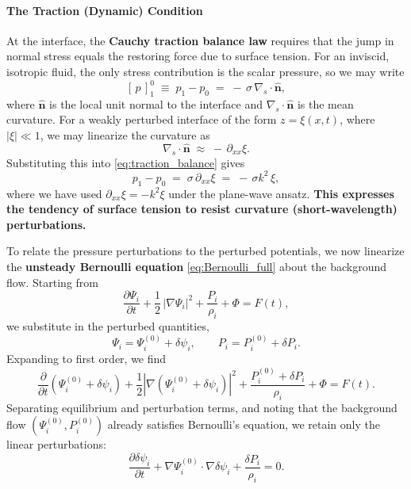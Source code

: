 \paragraph{The Traction (Dynamic) Condition}
At the interface, the \textbf{Cauchy traction balance law} requires that the jump in normal stress equals the restoring force due to surface tension. 
For an inviscid, isotropic fluid, the only stress contribution is the scalar pressure, so we may write
\begin{equation}
\label{eq:traction_balance}
\left[\,p\,\right]_{1}^{0} \;\equiv\; p_1 - p_0 \;=\; -\,\sigma\,\nabla_{\!s}\!\cdot\!\hat{\mathbf{n}},
\end{equation}
where $\hat{\mathbf{n}}$ is the local unit normal to the interface and $\nabla_{\!s}\!\cdot\!\hat{\mathbf{n}}$ is the mean curvature. 
For a weakly perturbed interface of the form $z=\xi(x,t)$, where $\lvert\xi\rvert \ll 1$, we may linearize the curvature as
\[
\nabla_{\!s}\!\cdot\!\hat{\mathbf{n}} \;\approx\; -\,\partial_{xx}\xi.
\]
Substituting this into \eqref{eq:traction_balance} gives
\begin{equation}
\label{eq:dynamic_sigma_clean}
p_1 - p_0 \;=\; \sigma\,\partial_{xx}\xi \;=\; -\,\sigma k^2\,\xi,
\end{equation}
where we have used $\partial_{xx}\xi = -k^2\xi$ under the plane-wave ansatz. \textbf{This expresses the tendency of surface tension to resist curvature (short-wavelength) perturbations.}
\par
To relate the pressure perturbations to the perturbed potentials, we now linearize the \textbf{unsteady Bernoulli equation} \eqref{eq:Bernoulli_full} about the background flow. 
Starting from
\begin{equation}
\frac{\partial \Psi_i}{\partial t} + \frac{1}{2}\,\lvert\nabla\Psi_i\rvert^2 + \frac{P_i}{\rho_i} + \Phi = F(t),
\end{equation}
we substitute in the perturbed quantities,
\[
\Psi_i = \Psi_i^{(0)} + \delta\psi_i, 
\qquad
P_i = P_i^{(0)} + \delta P_i.
\]
Expanding to first order, we find
\[
\frac{\partial}{\partial t}\left(\Psi_i^{(0)} + \delta\psi_i\right)
+ \frac{1}{2}\left|\nabla(\Psi_i^{(0)} + \delta\psi_i)\right|^2
+ \frac{P_i^{(0)} + \delta P_i}{\rho_i} + \Phi
= F(t).
\]
Separating equilibrium and perturbation terms, and noting that the background flow $(\Psi_i^{(0)},P_i^{(0)})$ already satisfies Bernoulli’s equation, we retain only the linear perturbations:
\[
\frac{\partial \delta\psi_i}{\partial t}
+ \nabla \Psi_i^{(0)} \!\cdot\! \nabla \delta\psi_i
+ \frac{\delta P_i}{\rho_i} = 0.
\]

